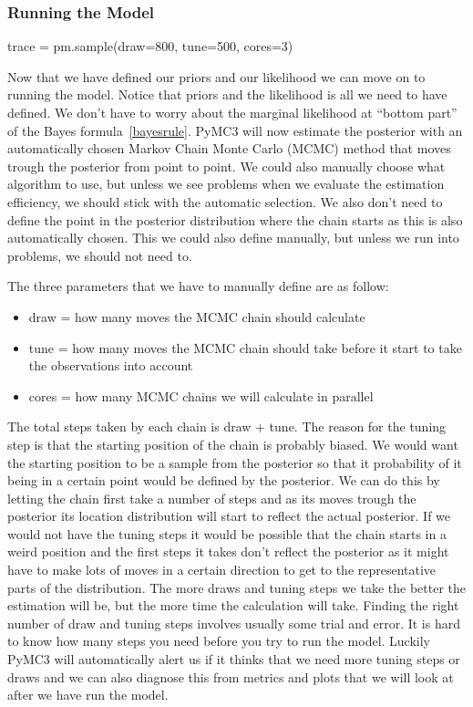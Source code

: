 \documentclass[12pt,a4paper,leqno]{report}
\theoremstyle{plain}
\theoremstyle{definition}
\theoremstyle{remark}
\begin{document}

\subsubsection{Running the Model}

\bigskip
\begin{pyverbatim}
trace = pm.sample(draw=800, tune=500, cores=3)
\end{pyverbatim}
\bigskip

Now that we have defined our priors and our likelihood we can move on to running the
model. Notice that priors and the likelihood is all we need to have defined. We don't
have to worry about the marginal likelihood at ``bottom part'' of the Bayes formula\ \ref{bayesrule}. PyMC3 will
now estimate the posterior with an automatically chosen Markov Chain Monte Carlo (MCMC) method
that moves trough the posterior from point to point. We could also manually choose what
algorithm to use, but unless we see problems when we evaluate the estimation efficiency,
we should stick with the automatic selection. We also don't need to define the point in the
posterior distribution where the chain starts as this is also automatically chosen. This
we could also define manually, but unless we run into problems, we should not need to.

The three parameters that we have to manually define are as follow:

\begin{itemize}
    \item draw = how many moves the MCMC chain should calculate
    \item tune = how many moves the MCMC chain should take before it start to
    take the observations into account
    \item cores = how many MCMC chains we will calculate in parallel
\end{itemize}

The total steps taken by each chain is draw + tune. The reason for the tuning step is
that the starting position of the chain is probably biased. We would want the starting
position to be a sample from the posterior so that it probability of it being in a certain
point would be defined by the posterior. We can do this by letting the chain first take
a number of steps and as its moves trough the posterior its location distribution will start to
reflect the actual posterior. If we would not have the tuning steps it would be possible
that the chain starts in a weird position and the first steps it takes don't reflect the
posterior as it might have to make lots of moves in a certain direction to get to the
representative parts of the distribution. The more draws and tuning steps we take the
better the estimation will be, but the more time the calculation will take. Finding the
right number of draw and tuning steps involves usually some trial and error. It is
hard to know how many steps you need before you try to run the model. Luckily PyMC3 will
automatically alert us if it thinks that we need more tuning steps or draws and we can
also diagnose this from metrics and plots that we will look at after we have run the
model.
\end{document}
